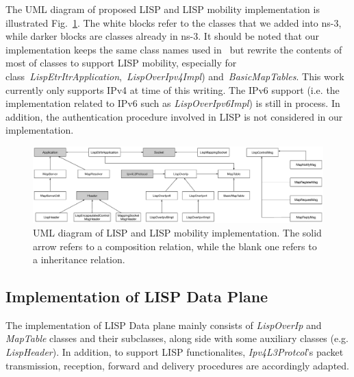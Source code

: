 The UML diagram of proposed LISP and LISP mobility implementation is illustrated Fig.~\ref{LISP_UML}. The white blocks refer to the classes that we added into ns-3, while darker blocks are classes already in ns-3. It should be noted that our implementation keeps the same class names used in~\cite{lionel2016} but rewrite the contents of most of classes to support LISP mobility, especially for class~\emph{LispEtrItrApplication},~\emph{LispOverIpv4Impl}) and~\emph{BasicMapTables}. This work currently only supports IPv4 at time of this writing. The IPv6 support (i.e. the implementation related to IPv6 such as \emph{LispOverIpv6Impl}) is still in process. In addition, the authentication procedure involved in LISP is not considered in our implementation.%
\begin{figure}[!t]
	\centering
	\includegraphics[width=\textwidth]{Pics/LISP_NS3_UML}
	\caption{UML diagram of LISP and LISP mobility implementation. The solid arrow refers to a composition relation, while the blank one refers to a inheritance relation.}
	\label{LISP_UML}
\end{figure}
\subsection{Implementation of LISP Data Plane}
\label{subsec:modifyInternet}
The implementation of LISP Data plane mainly consists of \emph{LispOverIp} and \emph{MapTable} classes and their subclasses, along side with some auxiliary classes (e.g. \emph{LispHeader}). In addition, to support LISP functionalites, \emph{Ipv4L3Protcol}'s packet transmission, reception, forward and delivery procedures are accordingly adapted.
